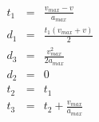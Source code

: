\begin{eqnarray*}
t_1 & = & \frac{v_{max} - v}{a_{max}} \\
d_1 & = & \frac{t_1 (v_{max} + v)}{2} \\
d_3 & = & \frac{v_{max}^2}{2 a_{max}} \\
d_2 & = & 0 \\
t_2 & = & t_1 \\
t_3 & = & t_2 + \frac{v_{max}}{a_{max}}
\end{eqnarray*}
